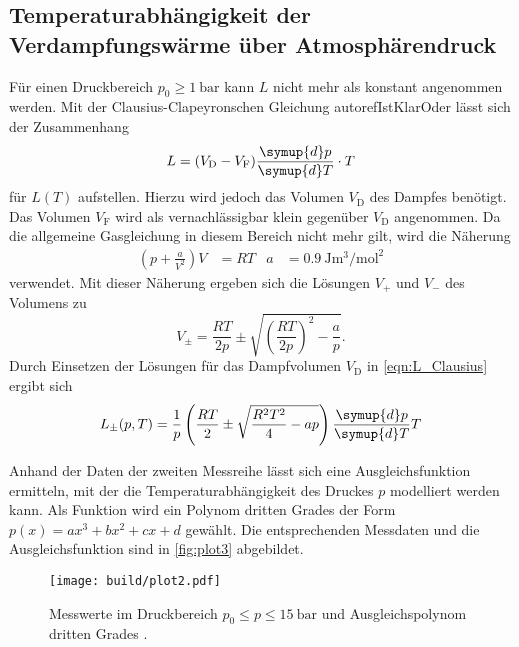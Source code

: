 \subsection{Temperaturabhängigkeit der Verdampfungswärme über Atmosphärendruck}
\label{subsec:A_Temperaturabhäng}
Für einen Druckbereich $p_0 \geq \qty{1}{\bar}$ kann $L$ nicht mehr als konstant angenommen werden. Mit der Clausius-Clapeyronschen Gleichung autoref{IstKlarOder}
lässt sich der Zusammenhang 
\begin{equation}
    \label{eqn:L_Clausius}
    L = (V_\text{D} - V_\text{F}) \frac{\symup{d}p}{\symup{d}T} \cdot T
\end{equation}
für $L(T)$ aufstellen. Hierzu wird jedoch das Volumen $V_\text{D}$ des Dampfes benötigt. Das Volumen $V_\text{F}$ wird als vernachlässigbar
klein gegenüber $V_\text{D}$ angenommen. Da die allgemeine Gasgleichung in diesem Bereich nicht mehr gilt, wird die Näherung 
\begin{align*}
    \left(p + \frac{a}{V^2}\right)V &= RT & a &= \qty{0.9}{\joule\cubic\metre\per\mol\squared}
\end{align*}
verwendet. Mit dieser Näherung ergeben sich die Lösungen $V_+$ und $V_-$ des Volumens zu 
\begin{equation*}
    V_\pm = \frac{RT}{2p} \pm \sqrt{\left(\frac{RT}{2p}\right)^2-\frac{a}{p}}.
\end{equation*}
Durch Einsetzen der Lösungen für das Dampfvolumen $V_\text{D}$ in \autoref{eqn:L_Clausius} ergibt sich
\begin{equation}
    L_\pm(p, T) = \frac{1}{p}\left(\frac{RT}{2} \pm \sqrt{\frac{R^2T^2}{4}- ap} \right) \frac{\symup{d}p}{\symup{d}T}T
\end{equation} 

Anhand der Daten der zweiten Messreihe lässt sich eine Ausgleichsfunktion ermitteln, mit der die Temperaturabhängigkeit des Druckes $p$ modelliert werden kann.
Als Funktion wird ein Polynom dritten Grades der Form $p(x) = ax^3 + bx^2 + cx + d$ gewählt. Die entsprechenden Messdaten und die Ausgleichsfunktion sind
in \autoref{fig:plot3} abgebildet. 

\begin{figure}
    \centering
    \texttt{[image: build/plot2.pdf]}
    \caption{Messwerte im Druckbereich $p_0 \leq p \leq \qty{15}{\bar}$ und Ausgleichspolynom dritten Grades \cite{scipy} \cite{matplotlib}.}
    \label{fig:plot2}
\end{figure}

